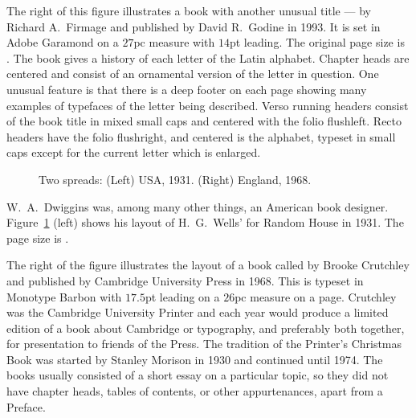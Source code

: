 \documentclass[10pt,letterpaper,extrafontsizes]{memoir}
\begin{document}
The right of this figure illustrates a book with another unusual title ---
 by Richard A.~Firmage and published by
David R.~Godine in 1993. It is set in 
Adobe Garamond on a $27$pc measure
with $14$pt leading. The original page size is . The
book gives a history of each letter of the Latin alphabet. 
Chapter heads are centered and consist of an 
ornamental version of the letter in question. One
unusual feature is that there is a deep footer 
on each page showing many examples of typefaces of the letter being 
described. Verso running headers consist of the book
title in mixed small caps and centered with the folio flushleft.
Recto headers have the folio flushright, and centered is the alphabet, 
typeset in small caps except for the current letter which is enlarged.


\begin{figure}
\centering
\begin{minipage}[b]{\pwlayi}
\end{minipage}
\hfill
\begin{minipage}[b]{\pwlayi}
\end{minipage}
\caption[Two spreads: USA, 1931 and England, 1968]%
        {Two spreads: (Left) USA, 1931.
         (Right) England, 1968.} \label{fb:6}
\end{figure}


    W.~A.~Dwiggins was, among many other things, an American book designer.
Figure~\ref{fb:6} (left) shows his layout of H.~G.~Wells'  for Random House in 1931. The page size is .

The right of the figure illustrates the layout of a book called 
by Brooke Crutchley 
and published by Cambridge University 
Press in 1968. This is typeset in 
Monotype Barbon
with $17.5$pt leading on a $26$pc measure on a  page.
Crutchley was the Cambridge University 
Printer and each year would produce
a limited edition of a book about Cambridge or typography, and preferably
both together, for presentation to friends of the Press. The tradition of
the Printer's Christmas Book 
was started by Stanley 
Morison 
in 1930 and continued until 1974. The books usually consisted of a short 
essay on a
particular topic, so they did not have chapter heads, tables of contents,
or other appurtenances, apart from a Preface.
\end{document}
